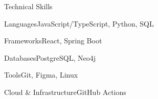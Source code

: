 \documentclass[
	11pt
]{../../../template}
\begin{document}
	\begin{rSection}{T}{echnical Skills}
		\begin{rSet}{Languages}{JavaScript/TypeScript, Python, SQL}
		\end{rSet}
		\begin{rSet}{Frameworks}{React, Spring Boot}
		\end{rSet}
		\begin{rSet}{Databases}{PostgreSQL, Neo4j}
		\end{rSet}
		\begin{rSet}{Tools}{Git, Figma, Linux}
		\end{rSet}
		\begin{rSet}{Cloud \& Infrastructure}{GitHub Actions}
		\end{rSet}
	\end{rSection}
\end{document}
